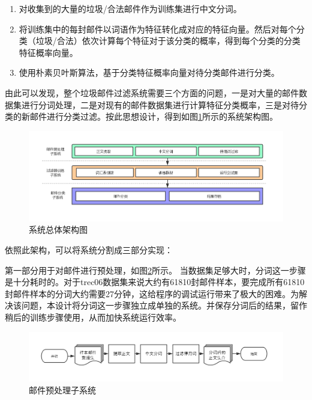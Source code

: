 \documentclass[UTF8,zihao=-4]{ctexart}
\begin{document}
	\begin{enumerate}
		\item 对收集到的大量的垃圾/合法邮件作为训练集进行中文分词。
		\item 将训练集中的每封邮件以词语作为特征转化成对应的特征向量。然后对每个分类（垃圾/合法）依次计算每个特征对于该分类的概率，得到每个分类的分类特征概率向量。
		\item 使用朴素贝叶斯算法，基于分类特征概率向量对待分类邮件进行分类。
	\end{enumerate}

	由此可以发现，整个垃圾邮件过滤系统需要三个方面的问题，一是对大量的邮件数据集进行分词处理，二是对现有的邮件数据集进行计算特征分类概率，三是对待分类的新邮件进行分类过滤。按此思想设计，得到如图\ref{fig:overall-structure}所示的系统架构图。
	
	\begin{figure}[H]
		\centering
		\setlength{\abovecaptionskip}{0.cm}
		\setlength{\belowcaptionskip}{-0.cm}
		\includegraphics[scale=0.5]{pictures/系统总体架构图.png}
		\caption{系统总体架构图}
		\label{fig:overall-structure}
	\end{figure}

	依照此架构，可以将系统分割成三部分实现：
	
	第一部分用于对邮件进行预处理，如图\ref{fig:preprocess-system}所示。
	当数据集足够大时，分词这一步骤是十分耗时的。对于trec06数据集来说大约有61810封邮件样本，要完成所有61810封邮件样本的分词大约需要27分钟，这给程序的调试运行带来了极大的困难。为解决该问题，本设计将分词这一步骤独立成单独的系统。并保存分词后的结果，留作稍后的训练步骤使用，从而加快系统运行效率。
	\begin{figure}[H]
		\centering
		\setlength{\abovecaptionskip}{0.cm}
		\setlength{\belowcaptionskip}{-0.cm}
		\includegraphics[scale=0.45]{pictures/邮件预处理子系统.png}
		\caption{邮件预处理子系统}
		\label{fig:preprocess-system}
	\end{figure}
	
\end{document}
